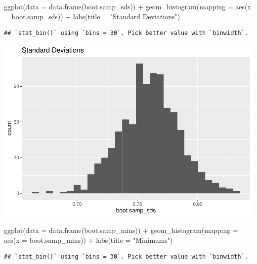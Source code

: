 \documentclass[
]{article}
\newenvironment{Shaded}{\begin{snugshade}}{\end{snugshade}}
\newcommand{\AttributeTok}[1]{\textcolor[rgb]{0.77,0.63,0.00}{#1}}
\newcommand{\FunctionTok}[1]{\textcolor[rgb]{0.00,0.00,0.00}{#1}}
\newcommand{\NormalTok}[1]{#1}
\newcommand{\SpecialCharTok}[1]{\textcolor[rgb]{0.00,0.00,0.00}{#1}}
\newcommand{\StringTok}[1]{\textcolor[rgb]{0.31,0.60,0.02}{#1}}
\begin{document}
\begin{Shaded}
\begin{Highlighting}[]
\FunctionTok{ggplot}\NormalTok{(}\AttributeTok{data =} \FunctionTok{data.frame}\NormalTok{(boot.samp\_sds)) }\SpecialCharTok{+}
  \FunctionTok{geom\_histogram}\NormalTok{(}\AttributeTok{mapping =} \FunctionTok{aes}\NormalTok{(}\AttributeTok{x =}\NormalTok{ boot.samp\_sds)) }\SpecialCharTok{+}
  \FunctionTok{labs}\NormalTok{(}\AttributeTok{title =} \StringTok{"Standard Deviations"}\NormalTok{)}
\end{Highlighting}
\end{Shaded}

\begin{verbatim}
## `stat_bin()` using `bins = 30`. Pick better value with `binwidth`.
\end{verbatim}

\includegraphics{Class_Exercises_ClassNotes_5_files/figure-latex/unnamed-chunk-11-1.pdf}
\newpage

\begin{Shaded}
\begin{Highlighting}[]
\FunctionTok{ggplot}\NormalTok{(}\AttributeTok{data =} \FunctionTok{data.frame}\NormalTok{(boot.samp\_mins)) }\SpecialCharTok{+}
  \FunctionTok{geom\_histogram}\NormalTok{(}\AttributeTok{mapping =} \FunctionTok{aes}\NormalTok{(}\AttributeTok{x =}\NormalTok{ boot.samp\_mins)) }\SpecialCharTok{+}
  \FunctionTok{labs}\NormalTok{(}\AttributeTok{title =} \StringTok{"Minimums"}\NormalTok{)}
\end{Highlighting}
\end{Shaded}

\begin{verbatim}
## `stat_bin()` using `bins = 30`. Pick better value with `binwidth`.
\end{verbatim}
\end{document}
